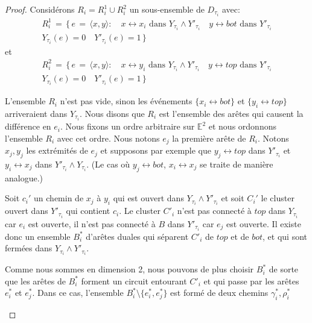 \documentclass[titlepage,a4paper,12pt]{article}
\begin{document}
\begin{proof}
Considérons $R_i = R_i^1\cup R_i^2$ un sous-ensemble de $D_{\tau_i}$ avec:
\begin{multline*}R_i^1 \,=\, \big\{ \,e \,=\, \langle x,y\rangle: \quad x\longleftrightarrow x_i \text{ dans } Y_{\tau_i}\wedge Y'_{\tau_i}
 \quad y\longleftrightarrow bot\text{ dans }Y'_{\tau_i}\\
Y_{\tau_i}(e) = 0\quad Y'_{\tau_i}(e) = 1
\,\big\}
\end{multline*}
et 
\begin{multline*}R_i^2 \,=\, \big\{ \,e \,=\, \langle x,y\rangle: \quad x\longleftrightarrow y_i \text{ dans } Y_{\tau_i}\wedge Y'_{\tau_i}
 \quad y\longleftrightarrow top\text{ dans }Y'_{\tau_i}\\
Y_{\tau_i}(e) = 0\quad Y'_{\tau_i}(e) = 1
\,\big\}
\end{multline*}

L'ensemble $R_i$ n'est pas vide, sinon les événements $\{x_i\longleftrightarrow bot\}$ et $\{y_i\longleftrightarrow top\}$ arriveraient dans $Y_{\tau_i}$. Nous disons que $R_i$ est l'ensemble des arêtes qui causent la différence en $e_i$. Nous fixons un ordre arbitraire sur $\mathbb{E}^2$ et nous ordonnons l'ensemble $R_i$ avec cet ordre. Nous notons $e_j$ la première arête de $R_i$. Notons $x_j,y_j$ les extrémités de $e_j$ et supposons par exemple que $y_j \longleftrightarrow top$ dans $Y'_{\tau_i}$ et $y_i\longleftrightarrow x_j$ dans $Y'_{\tau_i}\wedge Y_{\tau_i}$. (Le cas où $y_j\longleftrightarrow bot$, $x_i\longleftrightarrow x_j$ se traite de manière analogue.)

Soit $c_i'$ un chemin de $x_j$ à $y_i$ qui est ouvert dans $Y_{\tau_i}\wedge Y'_{\tau_i}$ et soit $C_i'$ le cluster ouvert dans $Y'_{\tau_i}$ qui contient $c_i$. Le cluster $C'_i$ n'est pas connecté à $top$ dans $Y_{\tau_i}$ car $e_i$ est ouverte, il n'est pas connecté à $B$ dans $Y'_{\tau_i}$ car $e_j$ est ouverte. Il existe donc un ensemble $B_i^*$ d'arêtes duales qui séparent $C'_i$ de $top$ et de $bot$, et qui sont fermées dans $Y_{\tau_i}\wedge Y'_{\tau_i}$.

Comme nous sommes en dimension 2, nous pouvons de plus choisir $B_i^*$ de sorte que les arêtes de $B_i^*$ forment un circuit entourant $C'_i$ et qui passe par les arêtes $e_i^*$ et $e_j^*$. Dans ce cas, l'ensemble $B_i^*\setminus \{e_i^*,e_j^*\}$ est formé de deux chemins $\gamma_i^*, \rho_i^*$
\begin{figure}[h]


\end{figure}
\end{proof}
\end{document}
